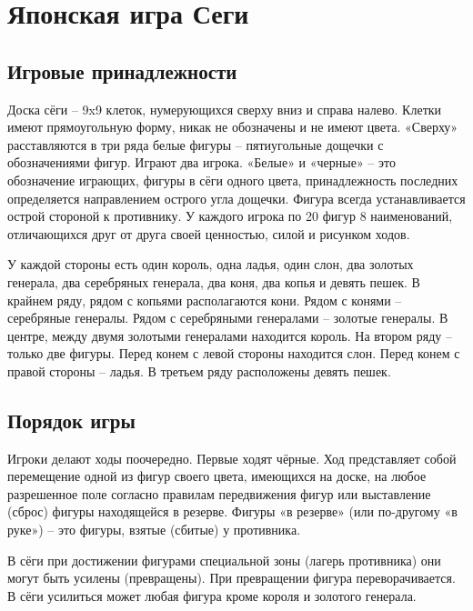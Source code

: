 





\tableofcontents
\newpage



\section{Японская игра Сеги}

\subsection{Игровые принадлежности}

Доска сёги – 9x9 клеток, нумерующихся сверху вниз и справа налево. Клетки имеют прямоугольную форму, никак не обозначены и не имеют цвета. «Сверху» расставляются в три ряда белые фигуры – пятиугольные дощечки с обозначениями фигур. Играют два игрока. «Белые» и «черные» – это обозначение играющих, фигуры в сёги одного цвета, принадлежность последних определяется направлением острого угла дощечки. Фигура всегда устанавливается острой стороной к противнику. У каждого игрока по 20 фигур 8 наименований, отличающихся друг от друга своей ценностью, силой и рисунком ходов.

У каждой стороны есть один король, одна ладья, один слон, два золотых генерала, два серебряных генерала, два коня, два копья и девять пешек. В крайнем ряду, рядом с копьями располагаются кони. Рядом с конями – серебряные генералы. Рядом с серебряными генералами – золотые генералы. В центре, между двумя золотыми генералами находится король. На втором ряду – только две фигуры. Перед конем с левой стороны находится слон. Перед конем с правой стороны – ладья. В третьем ряду расположены девять пешек.

\subsection{Порядок игры}

Игроки делают ходы поочередно. Первые ходят чёрные. Ход представляет собой перемещение одной из фигур своего цвета, имеющихся на доске, на любое разрешенное поле согласно правилам передвижения фигур или выставление (сброс) фигуры находящейся в резерве. Фигуры «в резерве» (или по-другому «в руке») – это фигуры, взятые (сбитые) у противника.

В сёги при достижении фигурами специальной зоны (лагерь противника) они могут быть усилены (превращены). При превращении фигура переворачивается. В сёги усилиться может любая фигура кроме короля и золотого генерала.

